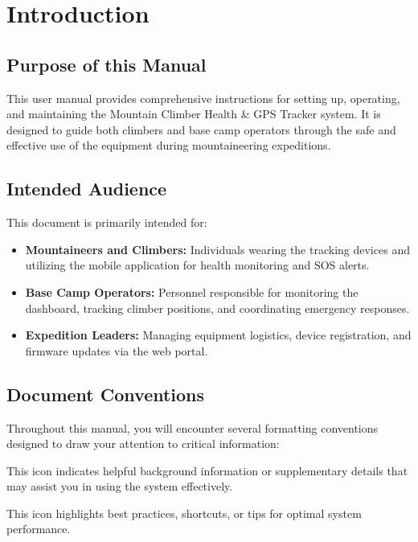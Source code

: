 \chapter{Introduction}
\label{ch:introduction}

\section{Purpose of this Manual}
This user manual provides comprehensive instructions for setting up, operating, and maintaining the Mountain Climber Health \& GPS Tracker system. It is designed to guide both climbers and base camp operators through the safe and effective use of the equipment during mountaineering expeditions. 

\section{Intended Audience}
This document is primarily intended for:
\begin{itemize}
    \item \textbf{Mountaineers and Climbers:} Individuals wearing the tracking devices and utilizing the mobile application for health monitoring and SOS alerts.
    \item \textbf{Base Camp Operators:} Personnel responsible for monitoring the dashboard, tracking climber positions, and coordinating emergency responses.
    \item \textbf{Expedition Leaders:} Managing equipment logistics, device registration, and firmware updates via the web portal.
\end{itemize}

\section{Document Conventions}
Throughout this manual, you will encounter several formatting conventions designed to draw your attention to critical information:

\begin{infobox}
This icon indicates helpful background information or supplementary details that may assist you in using the system effectively.
\end{infobox}

\begin{tipbox}
This icon highlights best practices, shortcuts, or tips for optimal system performance.
\end{tipbox}

